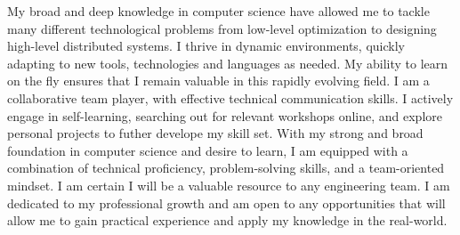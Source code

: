 
\begin{cvparagraph}

	My broad and deep knowledge in computer science have allowed me to tackle many different technological problems from low-level optimization to designing
	high-level distributed systems. I thrive in dynamic environments, quickly adapting to new
	tools, technologies and languages as needed. My ability to learn on the fly
	ensures that I remain valuable in this rapidly evolving field.
	I am a collaborative team player, with effective technical communication
	skills. I actively engage in self-learning, searching out for relevant
	workshops online, and explore personal projects to futher develope my skill
	set. With my strong and broad foundation in computer science and desire to
	learn, I am equipped with a combination of technical proficiency,
	problem-solving skills, and a team-oriented mindset. I am certain I will be a
	valuable resource to any engineering team. I am dedicated to my professional
	growth and am open to any opportunities that will allow me to gain practical
	experience and apply my knowledge in the real-world.

\end{cvparagraph}
